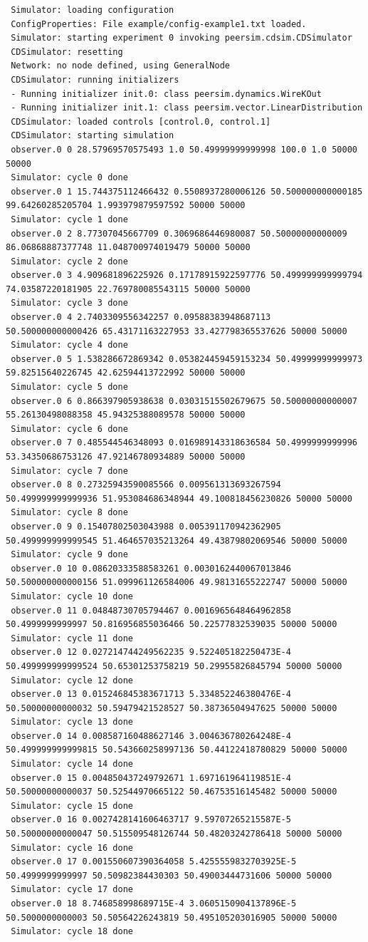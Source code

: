 \documentclass[a4paper,11pt]{article}
\begin{document}
\tiny
\begin{verbatim}
 Simulator: loading configuration
 ConfigProperties: File example/config-example1.txt loaded.
 Simulator: starting experiment 0 invoking peersim.cdsim.CDSimulator
 CDSimulator: resetting
 Network: no node defined, using GeneralNode
 CDSimulator: running initializers
 - Running initializer init.0: class peersim.dynamics.WireKOut
 - Running initializer init.1: class peersim.vector.LinearDistribution
 CDSimulator: loaded controls [control.0, control.1]
 CDSimulator: starting simulation
 observer.0 0 28.57969570575493 1.0 50.49999999999998 100.0 1.0 50000 50000
 Simulator: cycle 0 done
 observer.0 1 15.744375112466432 0.5508937280006126 50.500000000000185 99.64260285205704 1.993979879597592 50000 50000
 Simulator: cycle 1 done
 observer.0 2 8.77307045667709 0.3069686446980087 50.50000000000009 86.06868887377748 11.048700974019479 50000 50000
 Simulator: cycle 2 done
 observer.0 3 4.909681896225926 0.17178915922597776 50.499999999999794 74.03587220181905 22.769780085543115 50000 50000
 Simulator: cycle 3 done
 observer.0 4 2.7403309556342257 0.09588383948687113 50.500000000000426 65.43171163227953 33.427798365537626 50000 50000
 Simulator: cycle 4 done
 observer.0 5 1.538286672869342 0.053824459459153234 50.49999999999973 59.82515640226745 42.62594413722992 50000 50000
 Simulator: cycle 5 done
 observer.0 6 0.866397905938638 0.03031515502679675 50.50000000000007 55.26130498088358 45.94325388089578 50000 50000
 Simulator: cycle 6 done
 observer.0 7 0.485544546348093 0.016989143318636584 50.4999999999996 53.34350686753126 47.92146780934889 50000 50000
 Simulator: cycle 7 done
 observer.0 8 0.27325943590085566 0.009561313693267594 50.499999999999936 51.953084686348944 49.100818456230826 50000 50000
 Simulator: cycle 8 done
 observer.0 9 0.15407802503043988 0.005391170942362905 50.499999999999545 51.464657035213264 49.43879802069546 50000 50000
 Simulator: cycle 9 done
 observer.0 10 0.08620333588583261 0.0030162440067013846 50.500000000000156 51.099961126584006 49.98131655222747 50000 50000
 Simulator: cycle 10 done
 observer.0 11 0.04848730705794467 0.0016965648464962858 50.4999999999997 50.816956855036466 50.22577832539035 50000 50000
 Simulator: cycle 11 done
 observer.0 12 0.027214744249562235 9.522405182250473E-4 50.499999999999524 50.65301253758219 50.29955826845794 50000 50000
 Simulator: cycle 12 done
 observer.0 13 0.015246845383671713 5.334852246380476E-4 50.50000000000032 50.59479421528527 50.38736504947625 50000 50000
 Simulator: cycle 13 done
 observer.0 14 0.008587160488627146 3.004636780264248E-4 50.499999999999815 50.543660258997136 50.44122418780829 50000 50000
 Simulator: cycle 14 done
 observer.0 15 0.004850437249792671 1.697161964119851E-4 50.50000000000037 50.52544970665122 50.46753516145482 50000 50000
 Simulator: cycle 15 done
 observer.0 16 0.0027428141606463717 9.59707265215587E-5 50.50000000000047 50.515509548126744 50.48203242786418 50000 50000
 Simulator: cycle 16 done
 observer.0 17 0.001550607390364058 5.4255559832703925E-5 50.4999999999997 50.50982384430303 50.49003444731606 50000 50000
 Simulator: cycle 17 done
 observer.0 18 8.746858998689715E-4 3.0605150904137896E-5 50.5000000000003 50.50564226243819 50.495105203016905 50000 50000
 Simulator: cycle 18 done
\end{verbatim}
\end{document}
